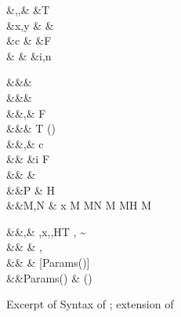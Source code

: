 \documentclass[screen,nonacm,manuscript,review]{acmart} %
\begin{document}
 \begin{figure}[ht]
 \begin{syntax}
  &\TyVar,\beta,\Co &\qquad{} &T \\
  &x,y &\qquad{} &\shl{\NType} \\
  &c &\qquad{} &F\\
                      &  &\qquad{} &i,n \in {}\\
 \end{syntax}
 \begin{syntax}
    &&\rho \bnfeq& \\
    &&\kappa \bnfeq& \star \bnfor \kappa \to \kappa \bnfor \shl{\sigma \sim^\kappa_\rho \tau}\\
    &&\tau,\sigma \bnfeq& \TyVar \bnfor {} \bnfor \tau\App\tau \bnfor \Forall {\TyVar\co\kappa} \tau \bnfor F\\
     &&\TypeConst \bnfeq& T \bnfor (\to) \bnfor \shl{\NType}\\
  &&\nu,\Co \bnfeq& c \bnfor {}\tau \bnfor \Sym\Co \bnfor \trans\nu\Co %
 \bnfor \Forall {\TyVar\co\kappa} \Co \bnfor \Co\At\tau %
 \bnfor \nu\App\Co \\
                  &&              &\bnfor \Left \Co \bnfor \Right \Co \bnfor \Nth i \Co \bnfor \TypeConst\App\many\Co \bnfor F\many\Co \bnfor \shl{\SubCo \Co} \\  %
  && \phi \bnfeq& \tau \bnfor \Co\\
  &&P \bnfeq& H\App \many{\TyVar\co\kappa} \\
  &&M,N \bnfeq& x \bnfor {} M \bnfor M\App N \bnfor \TLam{\tau\co\kappa} M \bnfor M\App \tau \bnfor H \bnfor \Case M  \bnfor \Cast \Tm \Co
 \end{syntax}
 \begin{syntax}
  &&\TEnv,\Delta \bnfeq& \empt \bnfor \TEnv,x\co\tau \bnfor \TEnv,\TyVar\co\kappa \bnfor \TEnv,H\co T \bnfor \TEnv, \Co \co \tau\sim\sigma\\
  && \bnfeq& \empt \bnfor {},\alpha\co\rho\\
                     &&\roles{\TypeConst} \bnfeq& {[\rho \mid \alpha\co\rho \in Params(\TypeConst)]}\\
                     &&Params(\TypeConst) \bnfeq& \many\alpha\co\rho\quad  {} (\TypeConst\App\many\alpha) \co \star%
 \end{syntax}
 \caption{Excerpt of Syntax of \SFR; extension of \SFC}
 \label{fig:sfr-syntax}
 \end{figure}
\end{document}
